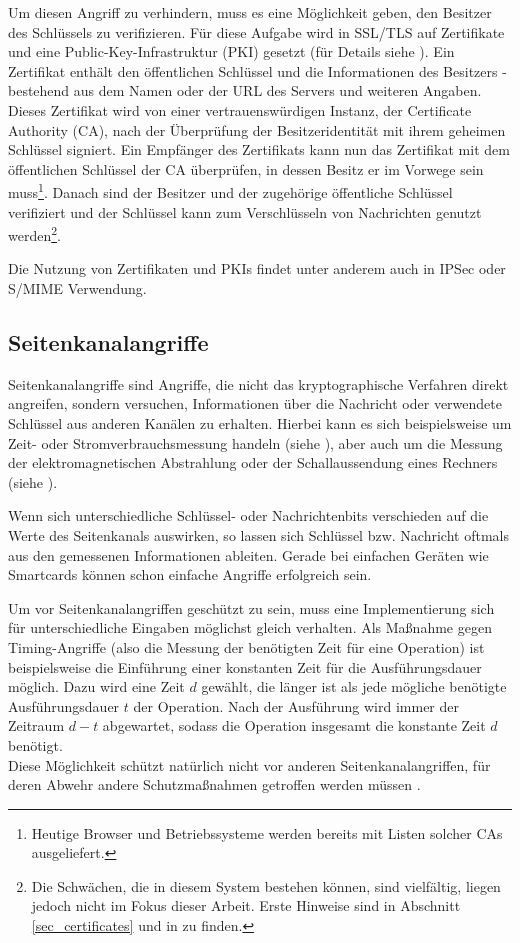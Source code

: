 Um diesen Angriff zu verhindern, muss es eine Möglichkeit geben, den Besitzer des Schlüssels zu verifizieren. Für diese Aufgabe wird in SSL/TLS auf Zertifikate und eine Public-Key-Infrastruktur (PKI) gesetzt (für Details siehe \cite{schmeh09}). Ein Zertifikat enthält den öffentlichen Schlüssel und die Informationen des Besitzers - bestehend aus dem Namen oder der URL des Servers und weiteren Angaben. Dieses Zertifikat wird von einer vertrauenswürdigen Instanz, der Certificate Authority (CA), nach der Überprüfung der Besitzeridentität mit ihrem geheimen Schlüssel signiert. Ein Empfänger des Zertifikats kann nun das Zertifikat mit dem öffentlichen Schlüssel der CA überprüfen, in dessen Besitz er im Vorwege sein muss\footnote{
	Heutige Browser und Betriebssysteme werden bereits mit Listen solcher CAs ausgeliefert.
}. Danach sind der Besitzer und der zugehörige öffentliche Schlüssel verifiziert und der Schlüssel kann zum Verschlüsseln von Nachrichten genutzt werden\footnote{
	Die Schwächen, die in diesem System bestehen können, sind vielfältig, liegen jedoch nicht im Fokus dieser Arbeit. Erste Hinweise sind in Abschnitt \ref{sec_certificates} und in \cite{ferguson10} zu finden.
}. 

Die Nutzung von Zertifikaten und PKIs findet unter anderem auch in IPSec oder S/MIME Verwendung. 

\subsection{Seitenkanalangriffe}
Seitenkanalangriffe sind Angriffe, die nicht das kryptographische Verfahren direkt angreifen, sondern versuchen, Informationen über die Nachricht oder verwendete Schlüssel aus anderen Kanälen zu erhalten. Hierbei kann es sich beispielsweise um Zeit- oder Stromverbrauchsmessung handeln (siehe \cite{kocher96, kocher99}), aber auch um die Messung der elektromagnetischen Abstrahlung oder der Schallaussendung eines Rechners (siehe \cite{vaneck85, genkin14}). 

Wenn sich unterschiedliche Schlüssel- oder Nachrichtenbits verschieden auf die Werte des Seitenkanals auswirken, so lassen sich Schlüssel bzw. Nachricht oftmals aus den gemessenen Informationen ableiten. Gerade bei einfachen Geräten wie Smartcards können schon einfache Angriffe erfolgreich sein.

Um vor Seitenkanalangriffen geschützt zu sein, muss eine Implementierung sich für unterschiedliche Eingaben möglichst gleich verhalten. Als Maßnahme gegen Timing-Angriffe (also die Messung der benötigten Zeit für eine Operation) ist beispielsweise die Einführung einer konstanten Zeit für die Ausführungsdauer möglich. Dazu wird eine Zeit \(d\) gewählt, die länger ist als jede mögliche benötigte Ausführungsdauer \(t\) der Operation. Nach der Ausführung wird immer der Zeitraum \(d-t\) abgewartet, sodass die Operation insgesamt die konstante Zeit \(d\) benötigt.\\
Diese Möglichkeit schützt natürlich nicht vor anderen Seitenkanalangriffen, für deren Abwehr andere Schutzmaßnahmen getroffen werden müssen \cite{ferguson10}.

